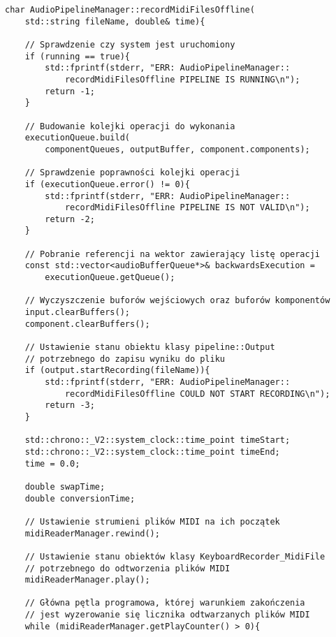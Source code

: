 \begin{lstlisting}
char AudioPipelineManager::recordMidiFilesOffline(
    std::string fileName, double& time){

    // Sprawdzenie czy system jest uruchomiony
    if (running == true){
        std::fprintf(stderr, "ERR: AudioPipelineManager::
            recordMidiFilesOffline PIPELINE IS RUNNING\n");
        return -1;
    }

    // Budowanie kolejki operacji do wykonania
    executionQueue.build(
        componentQueues, outputBuffer, component.components);

    // Sprawdzenie poprawności kolejki operacji
    if (executionQueue.error() != 0){
        std::fprintf(stderr, "ERR: AudioPipelineManager::
            recordMidiFilesOffline PIPELINE IS NOT VALID\n");
        return -2;
    }
    
    // Pobranie referencji na wektor zawierający listę operacji
    const std::vector<audioBufferQueue*>& backwardsExecution = 
        executionQueue.getQueue();

    // Wyczyszczenie buforów wejściowych oraz buforów komponentów
    input.clearBuffers();
    component.clearBuffers();

    // Ustawienie stanu obiektu klasy pipeline::Output
    // potrzebnego do zapisu wyniku do pliku
    if (output.startRecording(fileName)){
        std::fprintf(stderr, "ERR: AudioPipelineManager::
            recordMidiFilesOffline COULD NOT START RECORDING\n");
        return -3;
    }

    std::chrono::_V2::system_clock::time_point timeStart;
    std::chrono::_V2::system_clock::time_point timeEnd;
    time = 0.0;

    double swapTime;
    double conversionTime;

    // Ustawienie strumieni plików MIDI na ich początek
    midiReaderManager.rewind();

    // Ustawienie stanu obiektów klasy KeyboardRecorder_MidiFile
    // potrzebnego do odtworzenia plików MIDI
    midiReaderManager.play();

    // Główna pętla programowa, której warunkiem zakończenia
    // jest wyzerowanie się licznika odtwarzanych plików MIDI
    while (midiReaderManager.getPlayCounter() > 0){


\end{lstlisting}
